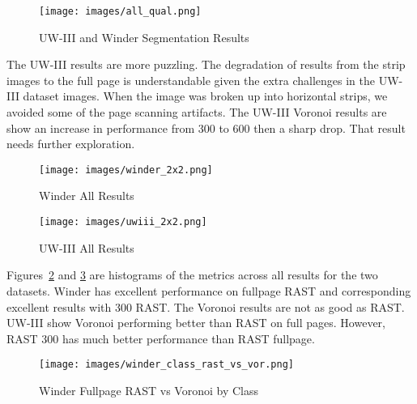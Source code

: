 \documentclass[conference]{IEEEtran}
\begin{document}
\begin{figure}[all-qualitative]
\begin{center}
\caption{UW-III and Winder Segmentation Results}
\label{fig:all-qualitative}
  \texttt{[image: images/all\_qual.png]}
\end{center}
\end{figure}

The UW-III results are more puzzling. The degradation of results from the
strip images to the full page is understandable given the extra challenges in
the UW-III dataset images. When the image was broken up into horizontal strips,
we avoided some of the page scanning artifacts. The UW-III Voronoi results are
show an increase in performance from 300 to 600 then a sharp drop. That result
needs further exploration.


\begin{figure}[winder_2x2]
\begin{center}
\caption{Winder All Results}
\label{fig:winder_2x2}
  \texttt{[image: images/winder\_2x2.png]}
\end{center}
\end{figure}

\begin{figure}[uwiii_2x2]
\begin{center}
\caption{UW-III All Results}
\label{fig:uwiii_2x2}
  \texttt{[image: images/uwiii\_2x2.png]}
\end{center}
\end{figure}

Figures~\ref{fig:winder_2x2} and \ref{fig:uwiii_2x2} are histograms of the
metrics across all results for the two datasets. Winder has excellent
performance on fullpage RAST and corresponding excellent results with 300 RAST.
The Voronoi results are not as good as RAST. UW-III show Voronoi performing
better than RAST on full pages. However, RAST 300 has much better performance
than RAST fullpage.

\begin{figure}[winder-class-rast-vs-vor]
\caption{Winder Fullpage RAST vs Voronoi by Class}
\begin{center}
\texttt{[image: images/winder\_class\_rast\_vs\_vor.png]}
\label{fig:winder-class-rast-vs-vor}
\end{center}
\end{figure}
\end{document}
